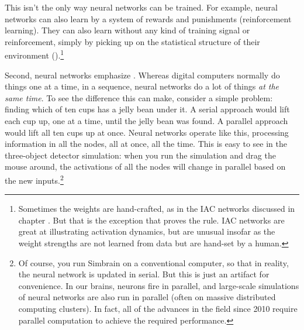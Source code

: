
This isn't the only way neural networks can be trained. For example, neural networks can also learn by a system of rewards and punishments (reinforcement learning). They can also learn without any kind of training signal or reinforcement, simply by picking up on the statistical structure of their environment ().\footnote{Sometimes the weights are hand-crafted, as in the IAC networks discussed in chapter . But that is the exception that proves the rule. IAC networks are great at illustrating activation dynamics, but are unusual insofar as the weight strengths are not learned from data but are hand-set by a human.}

Second, neural networks emphasize . Whereas digital computers normally do things one at a time, in a sequence, neural networks do a lot of things \emph{at the same time}. To see the difference this can make, consider a simple problem: finding which of ten cups has a jelly bean under it. A serial approach would lift each cup up, one at a time, until the jelly bean was found. A parallel approach would lift all ten cups up at once. Neural networks operate like this, processing information in all the nodes, all at once, all the time. This is easy to see  in the three-object detector simulation: when you run the simulation and drag the mouse around, the activations of all the nodes will change in parallel based on the new inputs.\footnote{Of course, you run Simbrain on a conventional computer, so that in reality, the neural network is updated in serial. But this is just an artifact for convenience. In our brains, neurons fire in parallel, and large-scale simulations of neural networks are also run in parallel (often on massive distributed computing clusters). In fact, all of the advances in the field since 2010 require parallel computation to achieve the required performance.} 

